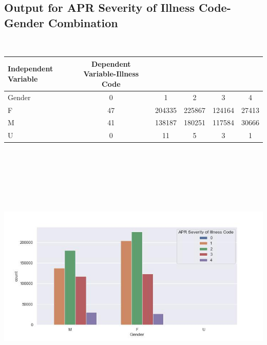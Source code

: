 \documentclass[
	letterpaper, %
]{jdf}
\begin{document}
\subsection{Output for APR Severity of Illness Code-Gender Combination}
\ 
\begin{jdftable}
\label{table:Example}
\small %
\begin{tabular}{@{} l c c c c c}
\textbf{Independent Variable} & \textbf{Dependent Variable-Illness Code} & & & & \\
	\toprule[0.5pt]
	Gender & 0 & 1 & 2 & 3 & 4 \\
\midrule
F & 47 & 204335 & 225867 & 124164 & 27413 \\
\midrule
M & 41 & 138187 & 180251 & 117584 & 30666 \\
\midrule
U & 0 & 11 & 5 & 3 & 1 \\
\end{tabular}
\end{jdftable}

\begin{jdffigure}
\includegraphics[height=13cm]{Figures/code-gender.jpg} \\
\label{fig:code-gender}%
\end{jdffigure}
\end{document}
